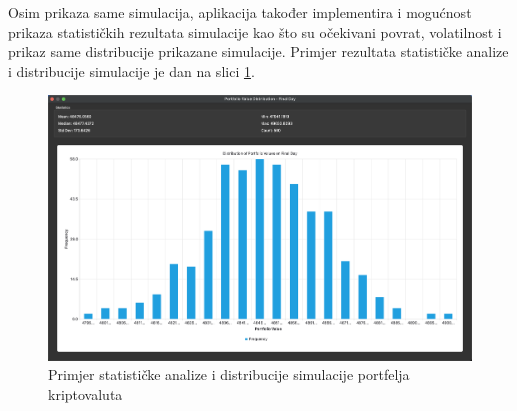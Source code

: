 \documentclass[zavrsnirad, upload]{fer}
\begin{document}
Osim prikaza same simulacija, aplikacija također
implementira i mogućnost prikaza statističkih
rezultata simulacije kao što su očekivani povrat, volatilnost
i prikaz same distribucije prikazane simulacije.
Primjer rezultata statističke analize i distribucije
simulacije je dan na slici \ref{fig:distribution_example}.
\begin{figure}[H]
    \centering
    \includegraphics[width=1.0\textwidth]{Figures/distribution_example.png}
    \caption{Primjer statističke analize i distribucije simulacije portfelja kriptovaluta}
    \label{fig:distribution_example}
\end{figure}
\end{document}
